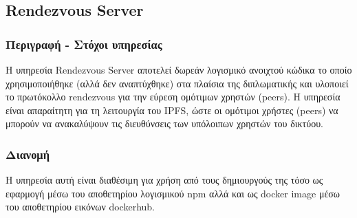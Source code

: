 \subsection{Rendezvous Server} \label{subsection:4-3-7-rendezvous-server-service}

\subsubsection{Περιγραφή - Στόχοι υπηρεσίας}

Η υπηρεσία Rendezvous Server αποτελεί δωρεάν λογισμικό ανοιχτού κώδικα το οποίο χρησιμοποιήθηκε (αλλά δεν αναπτύχθηκε) στα πλαίσια της διπλωματικής και υλοποιεί το πρωτόκολλο rendezvous για την εύρεση ομότιμων χρηστών (peers). Η υπηρεσία είναι απαραίτητη για τη λειτουργία του IPFS, ώστε οι ομότιμοι χρήστες (peers) να μπορούν να ανακαλύψουν τις διευθύνσεις των υπόλοιπων χρηστών του δικτύου.

\subsubsection{Διανομή}

Η υπηρεσία αυτή είναι διαθέσιμη για χρήση από τους δημιουργούς της τόσο ως εφαρμογή μέσω του αποθετηρίου λογισμικού npm αλλά και ως docker image μέσω του αποθετηρίου εικόνων dockerhub.